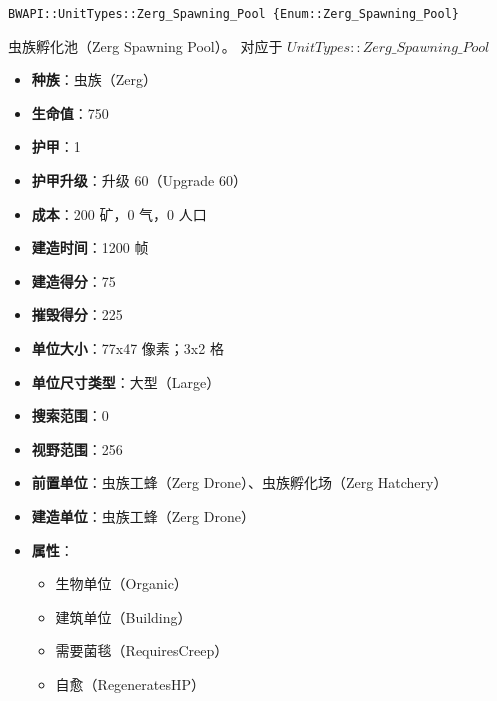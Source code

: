 \begin{tcolorbox}[colback=white, colframe=black!60!white, title=Zerg\_Spawning\_Pool(), arc=0mm]
    \begin{verbatim}
BWAPI::UnitTypes::Zerg_Spawning_Pool {Enum::Zerg_Spawning_Pool}
    \end{verbatim}
    虫族孵化池（Zerg Spawning Pool）。
    对应于  $UnitTypes::Zerg\_Spawning\_Pool$ 
    \begin{itemize}
        \item \textbf{种族}：虫族（Zerg）
        \item \textbf{生命值}：750
        \item \textbf{护甲}：1
        \item \textbf{护甲升级}：升级 60（Upgrade 60）
        \item \textbf{成本}：200 矿，0 气，0 人口
        \item \textbf{建造时间}：1200 帧
        \item \textbf{建造得分}：75
        \item \textbf{摧毁得分}：225
        \item \textbf{单位大小}：77x47 像素；3x2 格
        \item \textbf{单位尺寸类型}：大型（Large）
        \item \textbf{搜索范围}：0
        \item \textbf{视野范围}：256
        \item \textbf{前置单位}：虫族工蜂（Zerg Drone）、虫族孵化场（Zerg Hatchery）
        \item \textbf{建造单位}：虫族工蜂（Zerg Drone）
        \item \textbf{属性}：
            \begin{itemize}
                \item 生物单位（Organic）
                \item 建筑单位（Building）
                \item 需要菌毯（RequiresCreep）
                \item 自愈（RegeneratesHP）
            \end{itemize}
    \end{itemize}
\end{tcolorbox}

